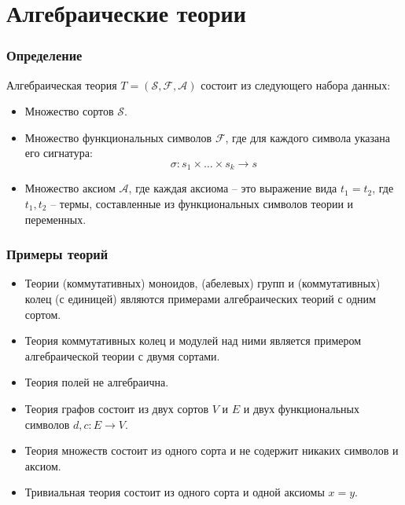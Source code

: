 \documentclass{beamer}
\theoremstyle{definition}
\begin{document}
\section{Алгебраические теории}

\begin{frame}
\frametitle{Определение}
Алгебраическая теория $T = (\mathcal{S},\mathcal{F},\mathcal{A})$ состоит из следующего набора данных:
\begin{itemize}
\item Множество сортов $\mathcal{S}$.
\item Множество функциональных символов $\mathcal{F}$, где для каждого символа указана его сигнатура:
\[ \sigma : s_1 \times \ldots \times s_k \to s \]
\item Множество аксиом $\mathcal{A}$, где каждая аксиома -- это выражение вида $t_1 = t_2$, где $t_1,t_2$ -- термы, составленные из функциональных символов теории и переменных.
\end{itemize}
\end{frame}

\begin{frame}
\frametitle{Примеры теорий}
\begin{itemize}
\item Теории (коммутативных) моноидов, (абелевых) групп и (коммутативных) колец (с единицей) являются примерами алгебраических теорий с одним сортом.
\item Теория коммутативных колец и модулей над ними является примером алгебраической теории с двумя сортами.
\item Теория полей не алгебраична.
\item Теория графов состоит из двух сортов $V$ и $E$ и двух функциональных символов $d,c : E \to V$.
\item Теория множеств состоит из одного сорта и не содержит никаких символов и аксиом.
\item Тривиальная теория состоит из одного сорта и одной аксиомы $x = y$.
\end{itemize}
\end{frame}
\end{document}
